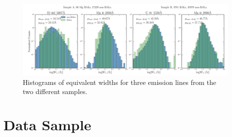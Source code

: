 \begin{figure} %
\centering
\includegraphics[width=1.0\textwidth]{figures/ewpaper/ew_hist_qsos.png}
\caption
{
Histograms of equivalent widths for three emission lines from the two different samples.
}
\label{fig:ew_hists}
\end{figure} %


\newpage

\section{Data Sample}



